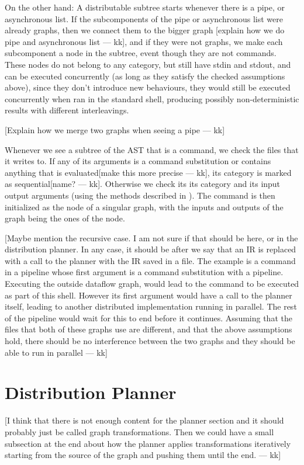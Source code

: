 \documentclass[sigplan,10pt,review,anonymous]{acmart}
\newcommand{\kk}[1]{[{\color{magenta}#1 --- kk}]}
\begin{document}
On the other hand: A distributable subtree starts whenever there is a
pipe, or asynchronous list. If the subcomponents of the pipe or
asynchronous list were already graphs, then we connect them to the
bigger graph \kk{explain how we do pipe and asynchronous list}, and if
they were not graphs, we make each subcomponent a node in the subtree,
event though they are not commands. These nodes do not belong to any
category, but still have stdin and stdout, and can be executed
concurrently (as long as they satisfy the checked assumptions above),
since they don't introduce new behaviours, they would still be
executed concurrently when ran in the standard shell, producing
possibly non-deterministic results with different interleavings.

\kk{Explain how we merge two graphs when seeing a pipe}

Whenever we see a subtree of the AST that is a command, we check the
files that it writes to. If any of its arguments is a command
substitution or contains anything that is evaluated\kk{make this more
  precise}, its category is marked as sequential\kk{name?}. Otherwise
we check its its category and its input output arguments (using the
methods described in ). The command is then initialized as
the node of a singular graph, with the inputs and outputs of the graph
being the ones of the node.


\kk{Maybe mention the recursive case. I am not sure if that should be
  here, or in the distribution planner. In any case, it should be
  after we say that an IR is replaced with a call to the planner with
  the IR saved in a file. The example is a command in a pipeline whose
  first argument is a command substitution with a pipeline. Executing
  the outside dataflow graph, would lead to the command to be executed
  as part of this shell. However its first argument would have a call
  to the planner itself, leading to another distributed implementation
  running in parallel. The rest of the pipeline would wait for this to
  end before it continues. Assuming that the files that both of these
  graphs use are different, and that the above assumptions hold, there
  should be no interference between the two graphs and they should be
  able to run in parallel}

\section{Distribution Planner}

\kk{I think that there is not enough content for the planner section
  and it should probably just be called graph transformations. Then we
  could have a small subsection at the end about how the planner
  applies transformations iteratively starting from the source of the
  graph and pushing them until the end.}
\end{document}
